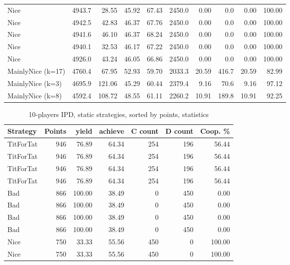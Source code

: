 \documentclass[journal,10pt,twoside]{IEEEtran}
\begin{document}
\begin{table}[ht]
\begin{tabular}{l|rrrr|rrrrr}
		Nice              & 4943.7 &  28.55 &  45.92 &   67.43 & 2450.0 &                   0.00 &    0.0 &                    0.00 &   100.00 \\
		Nice              & 4942.5 &  42.83 &  46.37 &   67.76 & 2450.0 &                   0.00 &    0.0 &                    0.00 &   100.00 \\
		Nice              & 4941.6 &  46.10 &  46.37 &   68.24 & 2450.0 &                   0.00 &    0.0 &                    0.00 &   100.00 \\
		Nice              & 4940.1 &  32.53 &  46.17 &   67.22 & 2450.0 &                   0.00 &    0.0 &                    0.00 &   100.00 \\
		Nice              & 4926.0 &  43.24 &  46.05 &   66.86 & 2450.0 &                   0.00 &    0.0 &                    0.00 &   100.00 \\
		MainlyNice (k=17) & 4760.4 &  67.95 &  52.93 &   59.70 & 2033.3 &                  20.59 &  416.7 &                   20.59 &    82.99 \\
		MainlyNice (k=3)  & 4695.9 & 121.06 &  45.29 &   60.44 & 2379.4 &                   9.16 &   70.6 &                    9.16 &    97.12 \\
		MainlyNice (k=8)  & 4592.4 & 108.72 &  48.55 &   61.11 & 2260.2 &                  10.91 &  189.8 &                   10.91 &    92.25 \\ \bottomrule
	\end{tabular}
\end{table}


\begin{table}[ht]
	\caption{10-players IPD, static strategies, sorted by points, statistics}
	\label{tab:ipdmp10stat}
	\centering
	\begin{tabular}{l|rrr|rrr} \toprule
		Strategy  & Points &  yield & achieve & C count & D count & Coop. \% \\ \midrule
		TitForTat &    946 &  76.89 &   64.34 &     254 &     196 &    56.44 \\
		TitForTat &    946 &  76.89 &   64.34 &     254 &     196 &    56.44 \\
		TitForTat &    946 &  76.89 &   64.34 &     254 &     196 &    56.44 \\
		TitForTat &    946 &  76.89 &   64.34 &     254 &     196 &    56.44 \\
		Bad       &    866 & 100.00 &   38.49 &       0 &     450 &     0.00 \\
		Bad       &    866 & 100.00 &   38.49 &       0 &     450 &     0.00 \\
		Bad       &    866 & 100.00 &   38.49 &       0 &     450 &     0.00 \\
		Bad       &    866 & 100.00 &   38.49 &       0 &     450 &     0.00 \\
		Nice      &    750 &  33.33 &   55.56 &     450 &       0 &   100.00 \\
		Nice      &    750 &  33.33 &   55.56 &     450 &       0 &   100.00 \\ \bottomrule
	\end{tabular}
\end{table}
\end{document}
